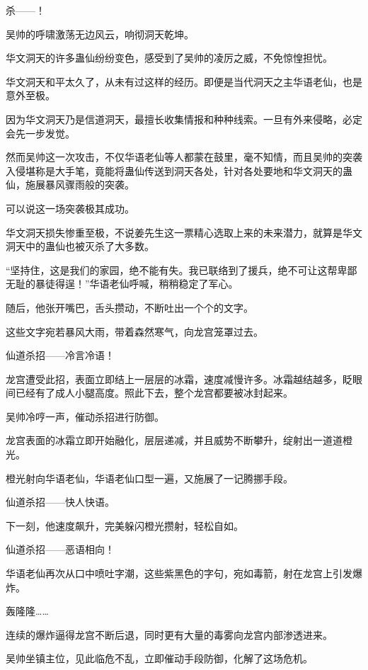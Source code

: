 
\begin{this_body}

杀——！

吴帅的呼啸激荡无边风云，响彻洞天乾坤。

华文洞天的许多蛊仙纷纷变色，感受到了吴帅的凌厉之威，不免惊惶担忧。

华文洞天和平太久了，从未有过这样的经历。即便是当代洞天之主华语老仙，也是意外至极。

因为华文洞天乃是信道洞天，最擅长收集情报和种种线索。一旦有外来侵略，必定会先一步发觉。

然而吴帅这一次攻击，不仅华语老仙等人都蒙在鼓里，毫不知情，而且吴帅的突袭入侵堪称是大手笔，竟能将蛊仙传送到洞天各处，针对各处要地和华文洞天的蛊仙，施展暴风骤雨般的突袭。

可以说这一场突袭极其成功。

华文洞天损失惨重至极，不说姜先生这一票精心选取上来的未来潜力，就算是华文洞天中的蛊仙也被灭杀了大多数。

“坚持住，这是我们的家园，绝不能有失。我已联络到了援兵，绝不可让这帮卑鄙无耻的暴徒得逞！”华语老仙呼喊，稍稍稳定了军心。

随后，他张开嘴巴，舌头攒动，不断吐出一个个的文字。

这些文字宛若暴风大雨，带着森然寒气，向龙宫笼罩过去。

仙道杀招——冷言冷语！

龙宫遭受此招，表面立即结上一层层的冰霜，速度减慢许多。冰霜越结越多，眨眼间已经有了成人小腿高度。照此下去，整个龙宫都要被冰封起来。

吴帅冷哼一声，催动杀招进行防御。

龙宫表面的冰霜立即开始融化，层层递减，并且威势不断攀升，绽射出一道道橙光。

橙光射向华语老仙，华语老仙口型一遍，又施展了一记腾挪手段。

仙道杀招——快人快语。

下一刻，他速度飙升，完美躲闪橙光攒射，轻松自如。

仙道杀招——恶语相向！

华语老仙再次从口中喷吐字潮，这些紫黑色的字句，宛如毒箭，射在龙宫上引发爆炸。

轰隆隆……

连续的爆炸逼得龙宫不断后退，同时更有大量的毒雾向龙宫内部渗透进来。

吴帅坐镇主位，见此临危不乱，立即催动手段防御，化解了这场危机。


\end{this_body}
